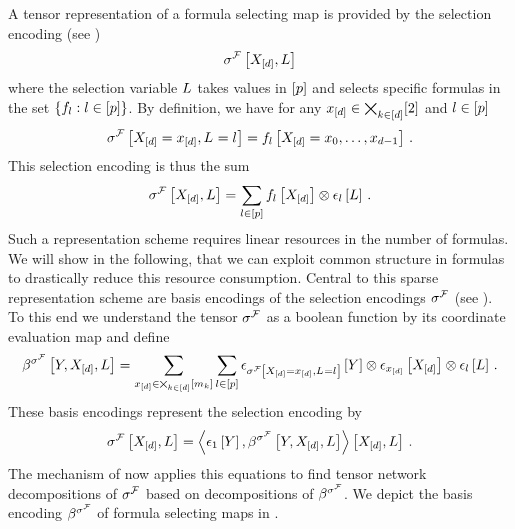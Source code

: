 A tensor representation of a formula selecting map is provided by the selection encoding (see )
\begin{align*}
    \sigma^{\mathcal{F}}\left[X_{[d]},L\right]
\end{align*}
where the selection variable $L$ takes values in $[p]$ and selects specific formulas in the set $\{f_{l} : l\in[p]\}$.
By definition, we have for any $x_{[d]}\in\bigtimes_{k\in[d]}[2]$ and $l\in[p]$
\begin{align*}
    \sigma^{\mathcal{F}}\left[X_{[d]}=x_{[d]},L_{}=l_{}\right]
    =  f_{l}\left[X_{[d]}={x_{0},\ldots,x_{d-1}}\right] \, .
\end{align*}
This selection encoding is thus the sum
\begin{align*}
    \sigma^{\mathcal{F}}\left[X_{[d]},L\right]
    = \sum_{l\in[p]} f_{l}\left[X_{[d]}\right]
    \otimes \epsilon_{l}\left[L\right] \, .
\end{align*}
Such a representation scheme requires linear resources in the number of formulas.
We will show in the following, that we can exploit common structure in formulas to drastically reduce this resource consumption.
Central to this sparse representation scheme are basis encodings of the selection encodings $\sigma^{\mathcal{F}}$ (see ).
To this end we understand the tensor $\sigma^{\mathcal{F}}$ as a boolean function by its coordinate evaluation map and define
\begin{align*}
    \beta^{\sigma^{\mathcal{F}}}\left[Y,X_{[d]},L\right]
    = \sum_{x_{[d]}\in\bigtimes_{k\in[d]}[m_{k}]}\sum_{l\in[p]} \epsilon_{\sigma^{\mathcal{F}}\left[X_{[d]}=x_{[d]},L_{}=l_{}\right]}\left[Y\right] \otimes \epsilon_{x_{[d]}}\left[X_{[d]}\right]  \otimes \epsilon_{l}\left[L\right] \, .
\end{align*}
These basis encodings represent the selection encoding by
\begin{align*}
    \sigma^{\mathcal{F}}\left[X_{[d]},L\right]
    = \left\langle \epsilon_{1}\left[Y\right],\beta^{\sigma^{\mathcal{F}}}\left[Y,X_{[d]},L\right]\right\rangle \left[ X_{[d]},L \right] \, .
\end{align*}
The mechanism of {\em \selectionSparsity{}} now applies this equations to find tensor network decompositions of $\sigma^{\mathcal{F}}$ based on decompositions of $\beta^{\sigma^{\mathcal{F}}}$.
We depict the basis encoding $\beta^{\sigma^{\mathcal{F}}}$ of formula selecting maps in .




